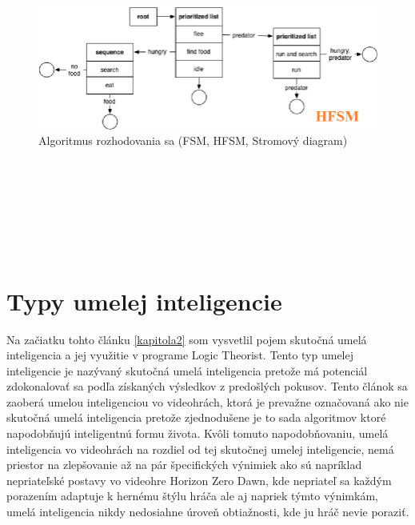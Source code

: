 \documentclass[10pt,oneside,slovak,a4paper]{article}
\begin{document}
\begin{figure}[tbh]
	\includegraphics[scale=0.4]{hfsm.png}
	\caption{Algoritmus rozhodovania sa (FSM, HFSM, Stromový diagram)}
	\label{obr6}
\end{figure}
\\\\
\\\\
\\\\
\section{Typy umelej inteligencie} \label{kapitola4}
Na začiatku tohto článku \ref{kapitola2} som vysvetlil pojem skutočná umelá inteligencia a jej využitie v programe Logic Theorist. Tento typ umelej inteligencie je nazývaný skutočná umelá inteligencia pretože má potenciál zdokonalovať sa podľa získaných výsledkov z predošlých pokusov. Tento článok sa zaoberá umelou inteligenciou vo videohrách, ktorá je prevažne označovaná ako nie skutočná umelá inteligencia pretože zjednodušene je to sada algoritmov ktoré napodobňujú inteligentnú formu života. Kvôli tomuto napodobňovaniu, umelá inteligencia vo videohrách na rozdiel od tej skutočnej umelej inteligencie, nemá priestor na zlepšovanie až na pár špecifických výnimiek ako sú napríklad nepriateľské postavy vo videohre Horizon Zero Dawn, kde nepriateľ sa každým porazením adaptuje k hernému štýlu hráča ale aj napriek týmto výnimkám, umelá inteligencia nikdy nedosiahne úroveň obtiažnosti, kde ju hráč nevie poraziť.
\end{document}
